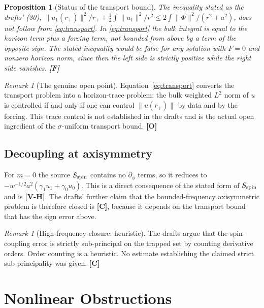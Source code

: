 \documentclass[11pt, a4paper]{article}
\newcommand{\VH}{\textcolor{vh}{\textbf{[V-H]}}}
\newcommand{\CC}{\textcolor{cc}{\textbf{[C]}}}
\newcommand{\FF}{\textcolor{ff}{\textbf{[F]}}}
\newcommand{\OO}{\textcolor{oo}{\textbf{[O]}}}
\newtheorem{proposition}[theorem]{Proposition}
\theoremstyle{remark}
\newtheorem{remark}[theorem]{Remark}
\theoremstyle{definition}
\begin{document}
\begin{proposition}[Status of the transport bound]
\label{prop:transport}
The inequality stated as the drafts' (30), $\|u_1(r_+)\|^2/r_+ + \tfrac12\int\|u_1\|^2/r^2 \le 2\int\|\Phi\|^2/(r^2+a^2)$, does not follow from \eqref{eq:transport}. In \eqref{eq:transport} the bulk integral is \emph{equal to} the horizon term plus a forcing term, not bounded from above by a term of the opposite sign. The stated inequality would be false for any solution with $F = 0$ and nonzero horizon norm, since then the left side is strictly positive while the right side vanishes. \FF
\end{proposition}

\begin{remark}[The genuine open point]
\label{rem:transport}
Equation~\eqref{eq:transport} converts the transport problem into a horizon-trace problem: the bulk weighted $L^2$ norm of $u$ is controlled if and only if one can control $\|u(r_+)\|$ by data and by the forcing. This trace control is not established in the drafts and is the actual open ingredient of the $\sigma$-uniform transport bound. \OO
\end{remark}

\subsection{Decoupling at axisymmetry}

For $m = 0$ the source $S_{\rm spin}$ contains no $\partial_\phi$ terms, so it reduces to $-w^{-1/2}a^2(\gamma_1 u_1 + \gamma_0 u_0)$. This is a direct consequence of the stated form of $S_{\rm spin}$ and is \VH. The drafts' further claim that the bounded-frequency axisymmetric problem is therefore closed is \CC, because it depends on the transport bound that has the sign error above.

\begin{remark}[High-frequency closure: heuristic]
The drafts argue that the spin-coupling error is strictly sub-principal on the trapped set by counting derivative orders. Order counting is a heuristic. No estimate establishing the claimed strict sub-principality was given. \CC
\end{remark}

\section{Nonlinear Obstructions}
\label{sec:nonlinear}
\end{document}
